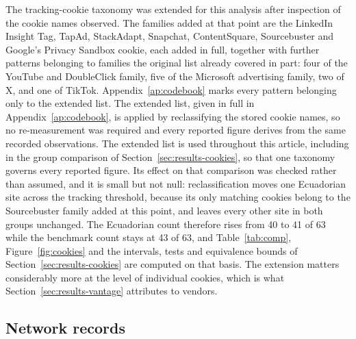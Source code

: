 \documentclass[]{interact}
\begin{document}
The tracking-cookie taxonomy was extended for this analysis after inspection of the cookie names observed. The families added at that point are the LinkedIn Insight Tag, TapAd, StackAdapt, Snapchat, ContentSquare, Sourcebuster and Google's Privacy Sandbox cookie, each added in full, together with further patterns belonging to families the original list already covered in part: four of the YouTube and DoubleClick family, five of the Microsoft advertising family, two of X, and one of TikTok. Appendix~\ref{ap:codebook} marks every pattern belonging only to the extended list. The extended list, given in full in Appendix~\ref{ap:codebook}, is applied by reclassifying the stored cookie names, so no re-measurement was required and every reported figure derives from the same recorded observations. The extended list is used throughout this article, including in the group comparison of Section~\ref{sec:results-cookies}, so that one taxonomy governs every reported figure. Its effect on that comparison was checked rather than assumed, and it is small but not null: reclassification moves one Ecuadorian site across the tracking threshold, because its only matching cookies belong to the Sourcebuster family added at this point, and leaves every other site in both groups unchanged. The Ecuadorian count therefore rises from 40 to 41 of 63 while the benchmark count stays at 43 of 63, and Table~\ref{tab:comp}, Figure~\ref{fig:cookies} and the intervals, tests and equivalence bounds of Section~\ref{sec:results-cookies} are computed on that basis. The extension matters considerably more at the level of individual cookies, which is what Section~\ref{sec:results-vantage} attributes to vendors.

\subsection{Network records}\label{sec:methods-network}
\end{document}
